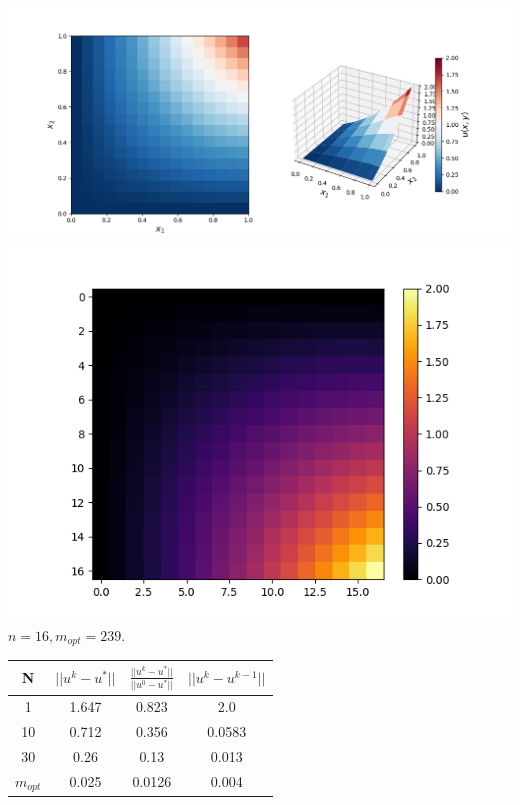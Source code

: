 \documentclass[a4paper, 12pt]{article}
\begin{document}
	\begin{center}
		\includegraphics[scale=0.5]{plot11_1.png} \\
		\includegraphics[scale=0.4]{plot11_2.png} \\
		 $n = 16, m_{opt} = 239$.
	\end{center}

	\begin{center}
		\begin{tabular}{||c c c c||} 
			\hline
			N & $||u^k-u^*||$ & $\frac{||u^k-u^*||}{||u^0-u^*||}$ & $||u^k-u^{k-1}||$ \\ [0.5ex] 
			\hline\hline
			1 & 1.647 & 0.823 & 2.0 \\ 
			\hline
			10 & 0.712 & 0.356 & 0.0583 \\
			\hline
			30 & 0.26 & 0.13 & 0.013 \\
			\hline
			$m_{opt}$ & 0.025 & 0.0126 & 0.004 \\ [1ex] 
			\hline
		\end{tabular}
	\end{center}
\end{document}
